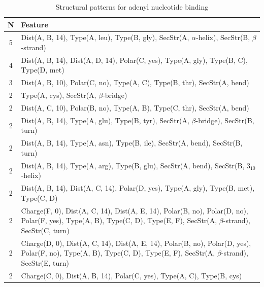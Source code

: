 \documentclass[11pt,twoside,a4paper]{book}
\begin{document}
\begin{table}\begin{tabularx}{\textwidth}{cX}\textbf{N} & \textbf{Feature} \\ \hline  
5 & Dist(A, B, 14),  Type(A, leu), Type(B, gly), SecStr(A, $\alpha$-helix), SecStr(B, $\beta$-strand)\\ \hline 
4 & Dist(A, B, 14), Dist(A, D, 14), Polar(C, yes),  Type(A, gly), Type(B, C), \newline Type(D, met)\\ \hline 
3 & Dist(A, B, 10), Polar(C, no),  Type(A, C), Type(B, thr), SecStr(A, bend)\\ \hline 
2 &  Type(A, cys), SecStr(A, $\beta$-bridge)\\ \hline 
2 & Dist(A, C, 10), Polar(B, no),  Type(A, B), Type(C, thr), SecStr(A, bend)\\ \hline 
2 & Dist(A, B, 14),  Type(A, glu), Type(B, tyr), SecStr(A, $\beta$-bridge), SecStr(B, turn)\\ \hline 
2 & Dist(A, B, 14),  Type(A, asn), Type(B, ile), SecStr(A, bend), SecStr(B, turn)\\ \hline 
2 & Dist(A, B, 14),  Type(A, arg), Type(B, glu), SecStr(A, bend), SecStr(B, $3_{10}$-helix)\\ \hline 
2 & Dist(A, B, 14), Dist(A, C, 14), Polar(D, yes),  Type(A, gly), Type(B, met), \newline Type(C, D)\\ \hline 
2 & Charge(F, 0), Dist(A, C, 14), Dist(A, E, 14), Polar(B, no), Polar(D, no), \newline Polar(F, yes),  Type(A, B), Type(C, D), Type(E, F), SecStr(A, $\beta$-strand), \newline SecStr(C, turn)\\ \hline 
2 & Charge(D, 0), Dist(A, C, 14), Dist(A, E, 14), Polar(B, no), Polar(D, yes), \newline Polar(F, no),  Type(A, B), Type(C, D), Type(E, F), SecStr(A, $\beta$-strand), \newline SecStr(E, turn)\\ \hline 
2 & Charge(C, 0), Dist(A, B, 14), Polar(C, yes),  Type(A, C), Type(B, cys)\\ \hline 
 \end{tabularx}\caption{Structural patterns for adenyl nucleotide binding}\label{tab:adenyl_nucleotide_binding}\end{table}
\end{document}
